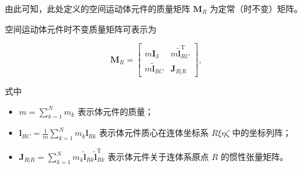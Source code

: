 由此可知，此处定义的空间运动体元件的质量矩阵 $\boldsymbol{M}_R$ 为定常（时不变）矩阵。
\begin{definition}[定义 8.2（体元件时不变质量矩阵）]
空间运动体元件时不变质量矩阵可表示为

\[
\boldsymbol{M}_R = \begin{bmatrix} m \boldsymbol{I}_3 & m \tilde{\boldsymbol{l}}_{RC}^{\mathrm{T}} \\ m \tilde{\boldsymbol{l}}_{RC} & \boldsymbol{J}_{R|R} \end{bmatrix},
\]

式中

\begin{itemize}

\item $m = \sum_{k=1}^{N} m_k$ 表示体元件的质量；

\item $\boldsymbol{l}_{RC} = \frac{1}{m}\sum_{k=1}^{N} m_k \boldsymbol{l}_{Rk}$ 表示体元件质心在连体坐标系 $R\xi\eta\zeta$ 中的坐标列阵；

\item $\boldsymbol{J}_{R|R} = \sum_{k=1}^{N} m_k \tilde{\boldsymbol{l}}_{Rk} \tilde{\boldsymbol{l}}_{Rk}^{\mathrm{T}}$ 表示体元件关于连体系原点 $R$ 的惯性张量矩阵。

\end{itemize}
\end{definition}
